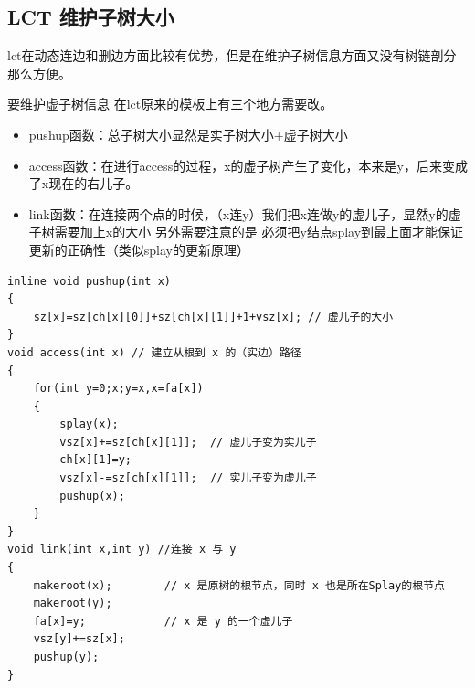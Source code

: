 \subsection{LCT 维护子树大小}
\par \noindent lct在动态连边和删边方面比较有优势，但是在维护子树信息方面又没有树链剖分那么方便。

\par \noindent 要维护虚子树信息 在lct原来的模板上有三个地方需要改。

\begin{itemize}
\item pushup函数：总子树大小显然是实子树大小+虚子树大小
\item access函数：在进行access的过程，x的虚子树产生了变化，本来是y，后来变成了x现在的右儿子。
\item link函数：在连接两个点的时候，（x连y）我们把x连做y的虚儿子，显然y的虚子树需要加上x的大小 另外需要注意的是 必须把y结点splay到最上面才能保证更新的正确性（类似splay的更新原理）
\end{itemize}
\begin{verbatim}
inline void pushup(int x)
{
    sz[x]=sz[ch[x][0]]+sz[ch[x][1]]+1+vsz[x]; // 虚儿子的大小
}
void access(int x) // 建立从根到 x 的（实边）路径
{
    for(int y=0;x;y=x,x=fa[x])
    {
        splay(x);
        vsz[x]+=sz[ch[x][1]];  // 虚儿子变为实儿子
        ch[x][1]=y;
        vsz[x]-=sz[ch[x][1]];  // 实儿子变为虚儿子
        pushup(x);
    }
}
void link(int x,int y) //连接 x 与 y
{
    makeroot(x);        // x 是原树的根节点，同时 x 也是所在Splay的根节点
    makeroot(y);
    fa[x]=y;            // x 是 y 的一个虚儿子
    vsz[y]+=sz[x];
    pushup(y);
}
\end{verbatim}